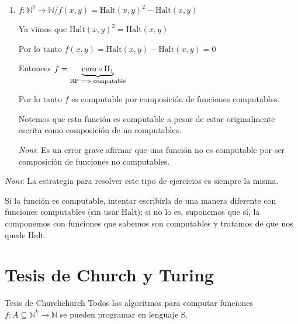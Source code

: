 \begin{enumerate}
        Como $g = l \circ f$ es computable por composición de computables,
        $\mathrm{Halt}$ es computable. ¡Absurdo!
        \begin{center}
            Conclusión: $f$ no es computable.
        \end{center}

    \item $f: \mathbb{N}^2 \to \mathbb{N} / 
        f(x,y) = \mathrm{Halt}(x,y)^2 - \mathrm{Halt}(x,y)$

        Ya vimos que $\mathrm{Halt}(x,y)^2 = \mathrm{Halt}(x,y)$

        Por lo tanto $f(x,y) = \mathrm{Halt}(x,y) - \mathrm{Halt}(x,y)=0$

        Entonces $f = \underbrace{\mathrm{cero} \circ \Pi_1}_{%
        \text{RP} \implies \text{computable}}$

        Por lo tanto $f$ es computable por composición de funciones 
        computables.

        Notemos que esta función es computable a pesar de estar originalmente 
        escrita como composición de no computables. 
        
        \textit{Noni}: Es un error grave afirmar que una función no es 
        computable por ser composición de funciones no computables. 
\end{enumerate}

\bigskip

\textit{Noni}: La estrategia para resolver este tipo de ejercicios es siempre
la misma.

Si la función es computable, intentar escribirla de una manera diferente con
funciones computables (sin usar $\mathrm{Halt}$); si no lo es, suponemos que
sí, la componemos con funciones que sabemos son computables y tratamos de que
nos quede $\mathrm{Halt}$.


\section{Tesis de Church y Turing}

\begin{tesis}{Tesis de Church}{church}
    Todos los algoritmos para computar funciones 
    $f: A \subseteq \mathbb{N}^k \to \mathbb{N}$ se pueden programar en
    lenguaje S.
\end{tesis}

